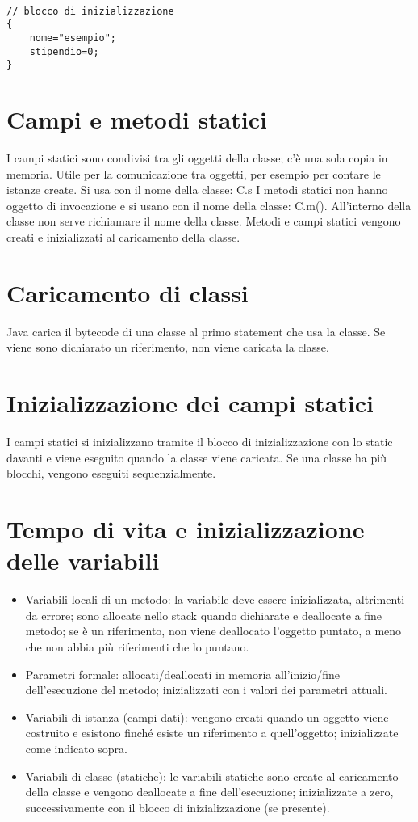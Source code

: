 \begin{verbatim}

// blocco di inizializzazione
{ 
    nome="esempio";
    stipendio=0;
}

\end{verbatim}
 

\section{Campi e metodi statici}
I campi statici sono condivisi tra gli oggetti della classe; c'è una sola copia in memoria. Utile per la comunicazione tra oggetti, per esempio per contare le istanze create.
Si usa con il nome della classe: C.s
I metodi statici non hanno oggetto di invocazione e si usano con il nome della classe: C.m().
All'interno della classe non serve richiamare il nome della classe.
Metodi e campi statici vengono creati e inizializzati al caricamento della classe.

\section{Caricamento di classi}
Java carica il bytecode di una classe al primo statement che usa la classe. Se viene sono dichiarato un riferimento, non viene caricata la classe.

\section{Inizializzazione dei campi statici}
I campi statici si inizializzano tramite il blocco di inizializzazione con lo static davanti e viene eseguito quando la classe viene caricata. Se una classe ha più blocchi, vengono eseguiti sequenzialmente.

\section{Tempo di vita e inizializzazione delle variabili}
\begin{itemize}
\item Variabili locali di un metodo: la variabile deve essere inizializzata, altrimenti da errore; sono allocate nello stack quando dichiarate e deallocate a fine metodo; se è un riferimento, non viene deallocato l'oggetto puntato, a meno che non abbia più riferimenti che lo puntano. 
\item Parametri formale: allocati/deallocati in memoria all'inizio/fine dell'esecuzione del metodo; inizializzati con i valori dei parametri attuali.
\item Variabili di istanza (campi dati): vengono creati quando un oggetto viene costruito e esistono finché esiste un riferimento a quell'oggetto; inizializzate come indicato sopra. 
\item Variabili di classe (statiche): le variabili statiche sono create al caricamento della classe e vengono deallocate a fine dell'esecuzione; inizializzate a zero, successivamente con il blocco di inizializzazione (se presente).
\end{itemize}